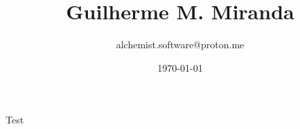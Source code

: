 \documentclass[12pt]{article}
\title{Guilherme M. Miranda}
\author{alchemist.software@proton.me}
\date{\today}
\begin{document}
\maketitle

Test
\end{document}
